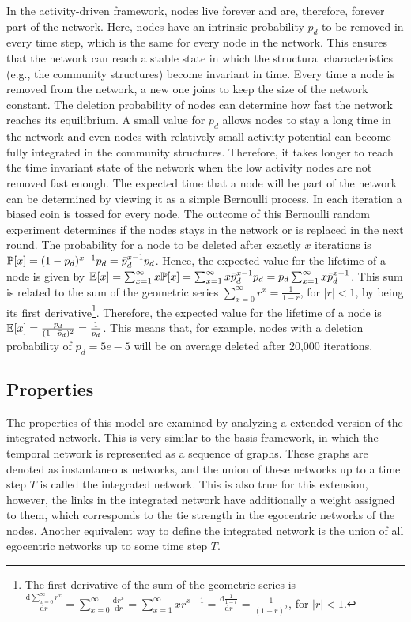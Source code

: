 In the activity-driven framework, nodes live forever and are, therefore, forever part of the network.
Here, nodes have an intrinsic probability \(p_{d}\) to be removed in every time step, which is the same for every node in the network.
This ensures that the network can reach a stable state in which the structural characteristics (e.g., the community structures) become invariant in time.
Every time a node is removed from the network, a new one joins to keep the size of the network constant.
The deletion probability of nodes can determine how fast the network reaches its equilibrium.
A small value for \(p_{d}\) allows nodes to stay a long time in the network and even nodes with relatively small activity potential can become fully integrated in the community structures.
Therefore, it takes longer to reach the time invariant state of the network when the low activity nodes are not removed fast enough.
The expected time that a node will be part of the network can be determined by viewing it as a simple Bernoulli process.
In each iteration a biased coin is tossed for every node.
The outcome of this Bernoulli random experiment determines if the nodes stays in the network or is replaced in the next round.
The probability for a node to be deleted after exactly \( x \) iterations is \( \mathbb{P}[{x}] = (1-p_{d})^{x-1} p_{d} = \bar{p}_{d}^{x-1} p_{d}\).
Hence, the expected value for the lifetime of a node is given by \( \mathbb{E}[{x}] = \sum_{x=1}^{\infty} x \mathbb{P}[{x}] = \sum_{x=1}^{\infty} x \bar{p}_{d}^{x-1} p_{d} = p_{d} \sum_{x=1}^{\infty} x \bar{p}_{d}^{x-1} \).
This sum is related to the sum of the geometric series \( \sum_{x=0}^{\infty} r^{x} = \frac{1}{1 - r} \), for \(|r| < 1 \), by being its first derivative\footnote{The first derivative of the sum of the geometric series is \( \frac{\mathrm{d} \sum_{x=0}^{\infty} r^{x}}{\mathrm{d} r} = \sum_{x=0}^{\infty} \frac{\mathrm{d} r^{x}}{\mathrm{d} r} = \sum_{x=1}^{\infty} x r^{x-1} = \frac{\mathrm{d} \frac{1}{1-r}}{\mathrm{d} r} = \frac{1}{(1 - r)^{2}} \), for \(|r| < 1\).}.
Therefore, the expected value for the lifetime of a node is \( \mathbb{E}[{x}] = \frac{p_{d}}{(1 - \bar{p}_{d})^{2}} = \frac{1}{p_{d}} \).
This means that, for example, nodes with a deletion probability of \(p_{d} = 5e-5\) will be on average deleted after 20,000 iterations.


\subsection{Properties}

The properties of this model are examined by analyzing a extended version of the integrated network.
This is very similar to the basis framework, in which the temporal network is represented as a sequence of graphs.
These graphs are denoted as instantaneous networks, and the union of these networks up to a time step \( T \) is called the integrated network.
This is also true for this extension, however, the links in the integrated network have additionally a weight assigned to them, which corresponds to the tie strength in the egocentric networks of the nodes.
Another equivalent way to define the integrated network is the union of all egocentric networks up to some time step \( T \).

